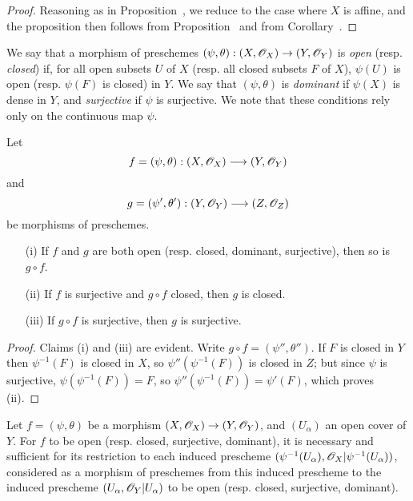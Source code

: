 \begin{proof}
\label{proof-1.2.2.5}
Reasoning as in Proposition~, we reduce to the case where $X$ is affine, and the proposition then follows from Proposition~ and from Corollary~.
\end{proof}

\begin{env}[2.2.6]
\label{I.2.2.6}
We say that a morphism of preschemes $(\psi,\theta):(X,\sh{O}_X)\to(Y,\sh{O}_Y)$ is \emph{open} (resp. \emph{closed}) if, for all open subsets $U$ of $X$ (resp. all closed subsets $F$ of $X$), $\psi(U)$ is open (resp. $\psi(F)$ is closed) in $Y$.
We say that $(\psi,\theta)$ is \emph{dominant} if $\psi(X)$ is dense in $Y$, and \emph{surjective} if $\psi$ is surjective.
We note that these conditions rely only on the continuous map $\psi$.
\end{env}

\begin{proposition}[2.2.7]
\label{I.2.2.7}
Let
\[
  f=(\psi,\theta):(X,\sh{O}_X)\to(Y,\sh{O}_Y)
\]
and
\[
  g=(\psi',\theta'):(Y,\sh{O}_Y)\to(Z,\sh{O}_Z)
\]
be morphisms of preschemes.
\begin{enumerate}
  \item[{\rm(i)}] If $f$ and $g$ are both open (resp. closed, dominant, surjective),
    then so is $g\circ f$.
  \item[{\rm(ii)}] If $f$ is surjective and $g\circ f$ closed, then $g$ is closed.
  \item[{\rm(iii)}] If $g\circ f$ is surjective, then $g$ is surjective.
\end{enumerate}
\end{proposition}

\begin{proof}
\label{proof-1.2.2.7}
Claims (i) and (iii) are evident.
Write $g\circ f=(\psi'',\theta'')$.
If $F$ is closed in $Y$ then $\psi^{-1}(F)$ is closed in $X$, so $\psi''(\psi^{-1}(F))$ is closed in $Z$;
but since $\psi$ is surjective, $\psi(\psi^{-1}(F))=F$, so $\psi''(\psi^{-1}(F))=\psi'(F)$, which proves (ii).
\end{proof}

\begin{proposition}[2.2.8]
\label{I.2.2.8}
Let $f=(\psi,\theta)$ be a morphism $(X,\sh{O}_X)\to(Y,\sh{O}_Y)$, and $(U_\alpha)$ an open cover of $Y$.
For $f$ to be open (resp. closed, surjective, dominant), it is necessary and sufficient for its restriction to each induced prescheme $(\psi^{-1}(U_\alpha),\mathscr{O}_X|\psi^{-1}(U_\alpha))$, considered as a morphism of preschemes from this induced prescheme to the induced prescheme $(U_\alpha,\mathscr{O}_Y|U_\alpha)$ to be open (resp. closed, surjective, dominant).
\end{proposition}

